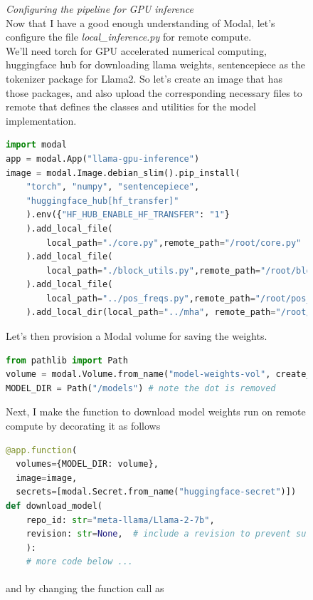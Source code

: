 \documentclass[12pt]{article}
\newcommand{\customtext}[3]{%
    \vspace{#2} %
    \fontsize{13}{8}\textcolor{#1}{\textit{#3}}%
}
\newcommand{\sidecite}[1]{\textsuperscript{\textcolor{blue}{\textbf{\scriptsize#1}}}}
\newcommand{\maincitecount}{\sidecite{\stepcounter{maincite}\themaincite}}
\begin{document}
\begin{figure}[!htb]
    \begin{minipage}[t]{0.65\textwidth}
    \raggedright
    \customtext{xtitle}{0em}{Configuring the pipeline for GPU inference}\\
Now that I have a good enough understanding of Modal, let's configure the file
{\it \small local\_inference.py} for remote compute.\\
We'll need torch for GPU accelerated numerical computing, huggingface hub for downloading 
llama weights, sentencepiece as the tokenizer package for Llama2. So let's create 
an image that has those packages, and also upload the corresponding necessary files to remote 
that defines the classes and utilities for the model implementation.

\begin{lstlisting}[language=python,style=python,basicstyle=\ttfamily\scriptsize]
import modal 
app = modal.App("llama-gpu-inference")
image = modal.Image.debian_slim().pip_install(
    "torch", "numpy", "sentencepiece",
    "huggingface_hub[hf_transfer]"
    ).env({"HF_HUB_ENABLE_HF_TRANSFER": "1"}
    ).add_local_file(
        local_path="./core.py",remote_path="/root/core.py"
    ).add_local_file(
        local_path="./block_utils.py",remote_path="/root/block_utils.py"
    ).add_local_file(
        local_path="../pos_freqs.py",remote_path="/root/pos_freqs.py"
    ).add_local_dir(local_path="../mha", remote_path="/root/mha")
\end{lstlisting}
Let's then provision a Modal volume for saving the weights. 
\begin{lstlisting}[language=python,style=python,basicstyle=\ttfamily\footnotesize]
from pathlib import Path
volume = modal.Volume.from_name("model-weights-vol", create_if_missing=True)
MODEL_DIR = Path("/models") # note the dot is removed
\end{lstlisting}
Next, I make the function to download model weights run on remote compute by decorating it as follows
\begin{lstlisting}[language=python,style=python,basicstyle=\ttfamily\footnotesize]
@app.function(
  volumes={MODEL_DIR: volume},
  image=image,
  secrets=[modal.Secret.from_name("huggingface-secret")])
def download_model(
    repo_id: str="meta-llama/Llama-2-7b",
    revision: str=None,  # include a revision to prevent surprises!
    ):
    # more code below ...
\end{lstlisting}
and by changing the function call as{\maincitecount} 
\begin{lstlisting}[language=python,style=python,basicstyle=\ttfamily\footnotesize]

\end{lstlisting}
\end{minipage}
\end{figure}
\end{document}
